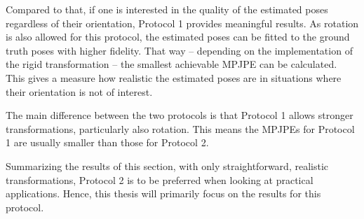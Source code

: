 Compared to that, if one is interested in the quality of the estimated poses regardless of their orientation, Protocol 1 provides meaningful results.
As rotation is also allowed for this protocol, the estimated poses can be fitted to the ground truth poses with higher fidelity.
That way -- depending on the implementation of the rigid transformation -- the smallest achievable MPJPE can be calculated.
This gives a measure how realistic the estimated poses are in situations where their orientation is not of interest.

The main difference between the two protocols is that Protocol 1 allows stronger transformations, particularly also rotation.
This means the MPJPEs for Protocol 1 are usually smaller than those for Protocol 2.

Summarizing the results of this section, with only straightforward, realistic transformations, Protocol 2 is to be preferred when looking at practical applications.
Hence, this thesis will primarily focus on the results for this protocol.